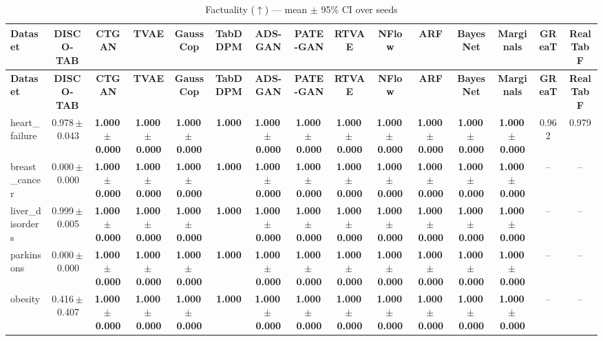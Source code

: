\documentclass[8pt]{extarticle}
\begin{document}
\begin{longtable}{l*{14}{c}}
\caption{Factuality ($\uparrow$) --- mean $\pm$ 95\% CI over seeds}\\
\toprule
\textbf{Dataset} & \textbf{DISCO-TAB} & \textbf{CTGAN} & \textbf{TVAE} & \textbf{GaussCop} & \textbf{TabDDPM} & \textbf{ADS-GAN} & \textbf{PATE-GAN} & \textbf{RTVAE} & \textbf{NFlow} & \textbf{ARF} & \textbf{BayesNet} & \textbf{Marginals} & \textbf{GReaT} & \textbf{RealTabF} \\
\midrule
\endfirsthead
\toprule
\textbf{Dataset} & \textbf{DISCO-TAB} & \textbf{CTGAN} & \textbf{TVAE} & \textbf{GaussCop} & \textbf{TabDDPM} & \textbf{ADS-GAN} & \textbf{PATE-GAN} & \textbf{RTVAE} & \textbf{NFlow} & \textbf{ARF} & \textbf{BayesNet} & \textbf{Marginals} & \textbf{GReaT} & \textbf{RealTabF} \\
\midrule
\endhead
\bottomrule
\endfoot
heart\_failure & 0.978\,$\pm$\,0.043 & \textbf{1.000\,$\pm$\,0.000} & \textbf{1.000\,$\pm$\,0.000} & \textbf{1.000\,$\pm$\,0.000} & \textbf{1.000} & \textbf{1.000\,$\pm$\,0.000} & \textbf{1.000\,$\pm$\,0.000} & \textbf{1.000\,$\pm$\,0.000} & \textbf{1.000\,$\pm$\,0.000} & \textbf{1.000\,$\pm$\,0.000} & \textbf{1.000\,$\pm$\,0.000} & \textbf{1.000\,$\pm$\,0.000} & 0.962 & 0.979 \\
breast\_cancer & 0.000\,$\pm$\,0.000 & \textbf{1.000\,$\pm$\,0.000} & \textbf{1.000\,$\pm$\,0.000} & \textbf{1.000\,$\pm$\,0.000} & \textbf{1.000} & \textbf{1.000\,$\pm$\,0.000} & \textbf{1.000\,$\pm$\,0.000} & \textbf{1.000\,$\pm$\,0.000} & \textbf{1.000\,$\pm$\,0.000} & \textbf{1.000\,$\pm$\,0.000} & \textbf{1.000\,$\pm$\,0.000} & \textbf{1.000\,$\pm$\,0.000} & -- & -- \\
liver\_disorders & 0.999\,$\pm$\,0.005 & \textbf{1.000\,$\pm$\,0.000} & \textbf{1.000\,$\pm$\,0.000} & \textbf{1.000\,$\pm$\,0.000} & \textbf{1.000} & \textbf{1.000\,$\pm$\,0.000} & \textbf{1.000\,$\pm$\,0.000} & \textbf{1.000\,$\pm$\,0.000} & \textbf{1.000\,$\pm$\,0.000} & \textbf{1.000\,$\pm$\,0.000} & \textbf{1.000\,$\pm$\,0.000} & \textbf{1.000\,$\pm$\,0.000} & -- & -- \\
parkinsons & 0.000\,$\pm$\,0.000 & \textbf{1.000\,$\pm$\,0.000} & \textbf{1.000\,$\pm$\,0.000} & \textbf{1.000\,$\pm$\,0.000} & \textbf{1.000} & \textbf{1.000\,$\pm$\,0.000} & \textbf{1.000\,$\pm$\,0.000} & \textbf{1.000\,$\pm$\,0.000} & \textbf{1.000\,$\pm$\,0.000} & \textbf{1.000\,$\pm$\,0.000} & \textbf{1.000\,$\pm$\,0.000} & \textbf{1.000\,$\pm$\,0.000} & -- & -- \\
obesity & 0.416\,$\pm$\,0.407 & \textbf{1.000\,$\pm$\,0.000} & \textbf{1.000\,$\pm$\,0.000} & \textbf{1.000\,$\pm$\,0.000} & \textbf{1.000} & \textbf{1.000\,$\pm$\,0.000} & \textbf{1.000\,$\pm$\,0.000} & \textbf{1.000\,$\pm$\,0.000} & \textbf{1.000\,$\pm$\,0.000} & \textbf{1.000\,$\pm$\,0.000} & \textbf{1.000\,$\pm$\,0.000} & \textbf{1.000\,$\pm$\,0.000} & -- & -- \\

\end{longtable}
\end{document}
